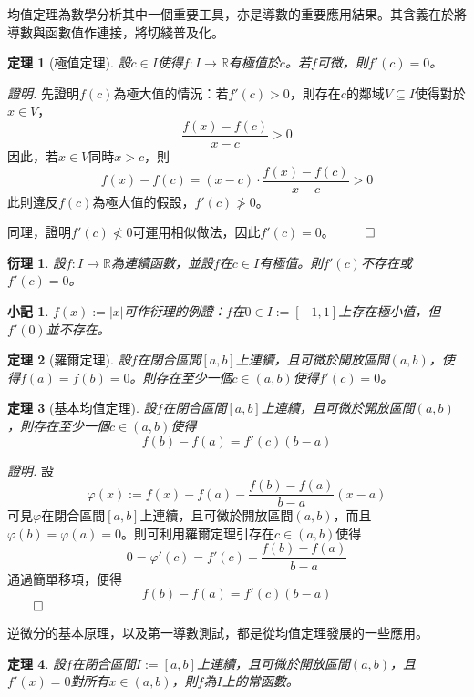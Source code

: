 \documentclass[12pt]{article}
\newtheorem*{theorem}{定理}
\newtheorem*{corollary}{衍理}
\newtheorem*{remark}{小記}
\renewenvironment*{proof}{\textit{證明.}}{\hfill$\qed$}
\begin{document}
    均值定理為數學分析其中一個重要工具，亦是導數的重要應用結果。其含義在於將導數與函數值作連接，將切綫普及化。

    \begin{theorem}[極值定理]
        設$c\in I$使得$f:I\to \mathbb{R}$有極值於$c$。若$f$可微，則$f'(c)=0$。
    \end{theorem}

    \begin{proof}
        先證明$f(c)$為極大值的情況：若$f'(c)>0$，則存在$c$的鄰域$V\subseteq I$使得對於$x\in V$，$$\frac{f(x)-f(c)}{x-c}>0$$因此，若$x\in V$同時$x>c$，則$$f(x)-f(c)=(x-c)\cdot\frac{f(x)-f(c)}{x-c}>0$$此則違反$f(c)$為極大值的假設，$f'(c)\not > 0$。

        同理，證明$f'(c)\not < 0$可運用相似做法，因此$f'(c)=0$。
    \end{proof}

    \begin{corollary}
        設$f:I\to\mathbb{R}$為連續函數，並設$f$在$c\in I$有極值。則$f'(c)$不存在或$f'(c)=0$。
    \end{corollary}

    \begin{remark}
        $f(x):=|x|$可作衍理的例證：$f$在$0\in I:=[-1,1]$上存在極小值，但$f'(0)$並不存在。
    \end{remark}

    \begin{theorem}[羅爾定理]
        設$f$在閉合區間$[a,b]$上連續，且可微於開放區間$(a,b)$，使得$f(a)=f(b)=0$。則存在至少一個$c\in(a,b)$使得$f'(c)=0$。
    \end{theorem}

    \begin{theorem}[基本均值定理]
        設$f$在閉合區間$[a,b]$上連續，且可微於開放區間$(a,b)$，則存在至少一個$c\in(a,b)$使得$$f(b)-f(a)=f'(c)(b-a)$$
    \end{theorem}

    \begin{proof}
        設$$\varphi(x):=f(x)-f(a)-\frac{f(b)-f(a)}{b-a}(x-a)$$可見$\varphi$在閉合區間$[a,b]$上連續，且可微於開放區間$(a,b)$，而且$\varphi(b)=\varphi(a)=0$。則可利用羅爾定理引存在$c\in(a,b)$使得$$0=\varphi'(c)=f'(c)-\frac{f(b)-f(a)}{b-a}$$通過簡單移項，便得$$f(b)-f(a)=f'(c)(b-a)$$
    \end{proof}

    逆微分的基本原理，以及第一導數測試，都是從均值定理發展的一些應用。

    \begin{theorem}
        設$f$在閉合區間$I:=[a,b]$上連續，且可微於開放區間$(a,b)$，且$f'(x)=0$對所有$x\in(a,b)$，則$f$為$I$上的常函數。
    \end{theorem}
\end{document}
